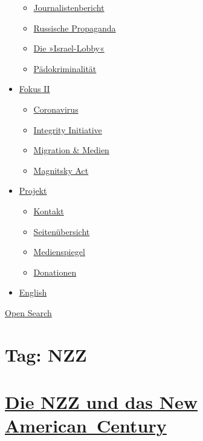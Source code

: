 \begin{itemize}
  \begin{itemize}
  \tightlist
  \item
    \href{https://swprs.org/bericht-eines-journalisten/}{Journalistenbericht}
  \item
    \href{https://swprs.org/russische-propaganda/}{Russische Propaganda}
  \item
    \href{https://swprs.org/die-israel-lobby-fakten-und-mythen/}{Die
    »Israel-Lobby«}
  \item
    \href{https://swprs.org/geopolitik-und-paedokriminalitaet/}{Pädokriminalität}
  \end{itemize}
\item
  \href{https://swprs.org/migration-und-medien/}{Fokus II}

  \begin{itemize}
  \tightlist
  \item
    \href{https://swprs.org/covid-19-hinweis-ii/}{Coronavirus}
  \item
    \href{https://swprs.org/die-integrity-initiative/}{Integrity
    Initiative}
  \item
    \href{https://swprs.org/migration-und-medien/}{Migration \& Medien}
  \item
    \href{https://swprs.org/der-fall-magnitsky/}{Magnitsky Act}
  \end{itemize}
\item
  \href{https://swprs.org/kontakt/}{Projekt}

  \begin{itemize}
  \tightlist
  \item
    \href{https://swprs.org/kontakt/}{Kontakt}
  \item
    \href{https://swprs.org/uebersicht/}{Seitenübersicht}
  \item
    \href{https://swprs.org/medienspiegel/}{Medienspiegel}
  \item
    \href{https://swprs.org/donationen/}{Donationen}
  \end{itemize}
\item
  \href{https://swprs.org/contact/}{English}
\end{itemize}

\protect\hyperlink{}{Open Search}

\hypertarget{tag-nzz}{%
\section{Tag: NZZ}\label{tag-nzz}}

\hypertarget{die-nzz-und-das-new-american-century}{%
\section{\texorpdfstring{\href{https://swprs.org/2017/03/01/nzz-new-american-century/}{Die
NZZ und das New
American~Century}}{Die NZZ und das New American~Century}}\label{die-nzz-und-das-new-american-century}}

